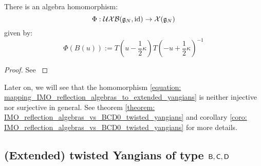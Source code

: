             \begin{proposition} \label{prop: mapping_IMO_reflection_algebras_to_extended_yangians}
                There is an algebra homomorphism:
                    \begin{equation} \label{equation: mapping_IMO_reflection_algebras_to_extended_yangians}
                        \Phi: \mathcal{UXB}(\mathfrak{g}_N, \mathrm{id}) \to \mathcal{X}(\mathfrak{g}_N)
                    \end{equation}
                given by:
                    $$\Phi(B(u)) := T\left(u - \frac12 \kappa\right) T\left(-u + \frac12 \kappa\right)^{-1}$$
            \end{proposition}
                \begin{proof}
                    See \cite[Proposition 3.2]{isaev_molev_ogievetsky_fusion_for_brauer_algebras_2}
                \end{proof}
            \begin{remark}
                Later on, we will see that the homomorphism \eqref{equation: mapping_IMO_reflection_algebras_to_extended_yangians} is neither injective nor surjective in general. See theorem \ref{theorem: IMO_reflection_algebras_vs_BCD0_twisted_yangians} and corollary \ref{coro: IMO_reflection_algebras_vs_BCD0_twisted_yangians} for more details.
            \end{remark}

        \subsection{(Extended) twisted Yangians of type \texorpdfstring{$\mathsf{B}, \mathsf{C}, \mathsf{D}$}{}}
            \begin{definition} \label{def: (extended)_twisted_yangians}
                
            \end{definition}

